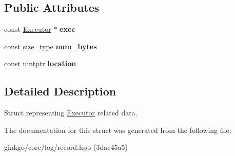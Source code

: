 \subsection*{Public Attributes}
\begin{DoxyCompactItemize}
\item 
\mbox{\label{structgko_1_1log_1_1executor__data_af2abfc8622da8be8466de15db9c15f82}} 
const \hyperlink{classgko_1_1Executor}{Executor} $\ast$ {\bfseries exec}
\item 
\mbox{\label{structgko_1_1log_1_1executor__data_ae163391b85c824367dd0c7e4771ac8c9}} 
const \hyperlink{namespacegko_a6e5c95df0ae4e47aab2f604a22d98ee7}{size\+\_\+type} {\bfseries num\+\_\+bytes}
\item 
\mbox{\label{structgko_1_1log_1_1executor__data_a5ff784e87bb40d732118a9bd77457ebe}} 
const uintptr {\bfseries location}
\end{DoxyCompactItemize}


\subsection{Detailed Description}
Struct representing \hyperlink{classgko_1_1Executor}{Executor} related data. 

The documentation for this struct was generated from the following file\+:\begin{DoxyCompactItemize}
\item 
ginkgo/core/log/record.\+hpp (3dac45a5)\end{DoxyCompactItemize}
